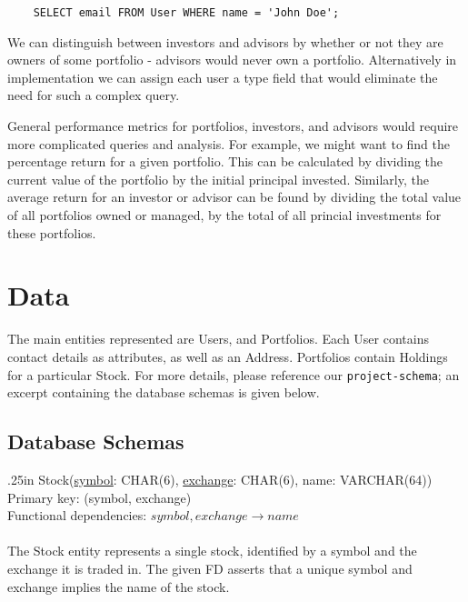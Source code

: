 \documentclass[letterpaper]{report}
\begin{document}
\verb|    SELECT email FROM User WHERE name = 'John Doe';|

We can distinguish between investors and advisors by whether or not they are owners of some portfolio - advisors would never own a portfolio. Alternatively in implementation we can assign each user a type field that would eliminate the need for such a complex query.

General performance metrics for portfolios, investors, and advisors would require more complicated queries and analysis. For example, we might want to find the percentage return for a given portfolio. This can be calculated by dividing the current value of the portfolio by the initial principal invested. Similarly, the average return for an investor or advisor can be found by dividing the total value of all portfolios owned or managed, by the total of all princial investments for these portfolios.

\section*{Data}

The main entities represented are {\sf User}s, and {\sf Portfolio}s. Each {\sf User} contains contact details as attributes, as well as an {\sf Address}. {\sf Portfolio}s contain {\sf Holding}s for a particular {\sf Stock}. For more details, please reference our {\tt project-schema}; an excerpt containing the database schemas is given below.

\subsection*{Database Schemas}

\hangindent .25in
{\sffamily Stock(\underline{symbol}: CHAR(6), \underline{exchange}: CHAR(6), name: VARCHAR(64))} \\
Primary key: {\sffamily (symbol, exchange)} \\
Functional dependencies: $symbol, exchange \to name$ \\\\
The {\sffamily Stock} entity represents a single stock, identified by a symbol and the exchange it is traded in. The given FD asserts that a unique symbol and exchange implies the name of the stock.
\end{document}
